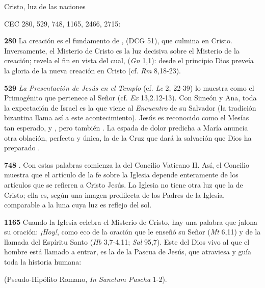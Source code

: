\begin{body}
\begin{body}
{Cristo, luz de las naciones

CEC 280, 529, 748, 1165, 2466, 2715:

\textbf{280} La creación es el fundamento de ,  (DCG 51), que culmina en Cristo. Inversamente, el Misterio de Cristo es la luz decisiva sobre el Misterio de la creación; revela el fin en vista del cual,  (\emph{Gn} 1,1): desde el principio Dios preveía la gloria de la nueva creación en Cristo (cf. \emph{Rm} 8,18-23).

\textbf{529} \emph{La Presentación de Jesús en el Templo} (cf. \emph{Lc} 2, 22-39) lo muestra como el Primogénito que pertenece al Señor (cf. \emph{Ex} 13,2.12-13). Con Simeón y Ana, toda la expectación de Israel es la que viene al \emph{Encuentro} de su Salvador (la tradición bizantina llama así a este acontecimiento). Jesús es reconocido como el Mesías tan esperado,  y , pero también . La espada de dolor predicha a María anuncia otra oblación, perfecta y única, la de la Cruz que dará la salvación que Dios ha preparado .

\textbf{748} . Con estas palabras comienza la  del Concilio Vaticano II. Así, el Concilio muestra que el artículo de la fe sobre la Iglesia depende enteramente de los artículos que se refieren a Cristo Jesús. La Iglesia no tiene otra luz que la de Cristo; ella es, según una imagen predilecta de los Padres de la Iglesia, comparable a la luna cuya luz es reflejo del sol.

\textbf{1165} Cuando la Iglesia celebra el Misterio de Cristo, hay una palabra que jalona su oración: \emph{¡Hoy!}, como eco de la oración que le enseñó su Señor (\emph{Mt} 6,11) y de la llamada del Espíritu Santo (\emph{Hb} 3,7-4,11; \emph{Sal} 95,7). Este  del Dios vivo al que el hombre está llamado a entrar, es la  de la Pascua de Jesús, que atraviesa y guía toda la historia humana:

 (Pseudo-Hipólito Romano, \emph{In Sanctum Pascha} 1-2).

}
\end{body}
\end{body}
